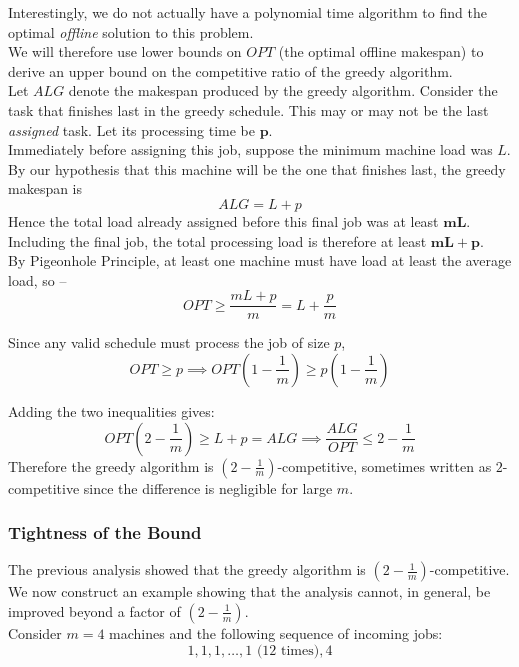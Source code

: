 Interestingly, we do not actually have a polynomial time algorithm to find the optimal \emph{offline} solution to this problem.\\


\noindent We will therefore use lower bounds on $OPT$ (the optimal offline makespan) to derive an upper 
bound on the competitive ratio of the greedy algorithm.\\

\noindent Let $ALG$ denote the makespan produced by the greedy algorithm. Consider the task that 
finishes last in the greedy schedule. This may or may not be the last \emph{assigned} task. Let its 
processing time be $\mathbf{p}$.\\

\noindent Immediately before assigning this job, suppose the minimum machine load was $L$.
By our hypothesis that this machine will be the one that finishes last, the greedy makespan is 
\[
ALG=L+p
\]
\vspace{0.5em}
Hence the total load already assigned before this final job was at least $\mathbf{mL}$.
Including the final job, the total processing load is therefore at least $\mathbf{mL+p}$.\\


\noindent By Pigeonhole Principle, at least one machine must have load at least the average load, so --
\[
OPT\ge \frac{mL+p}{m} = L+\frac{p}{m}
\]

Since any valid schedule must process the job of size $p$,
\[
OPT\ge p \implies OPT(1-\frac{1}{m})\ge p\left(1-\frac{1}{m}\right)
\]

Adding the two inequalities gives:
\[
OPT(2-\frac{1}{m})\ge L+p = ALG
\implies
\boxed{\frac{ALG}{OPT}\le 2-\frac1m}
\]
\vspace{0.5em}
Therefore the greedy algorithm is $\left(2-\frac1m\right)$-competitive, sometimes written as $2$-competitive 
since the difference is negligible for large $m$.

\subsubsection*{Tightness of the Bound}

The previous analysis showed that the greedy algorithm is $\left(2-\frac1m\right)$-competitive.
 We now construct an example showing that the analysis cannot,
 in general, be improved beyond a factor of $\left(2-\frac1m\right)$. \\

Consider $m=4$ machines and the following sequence of incoming jobs:
\[
1,1,1,\dots,1 \text{ (12 times)},4
\]

